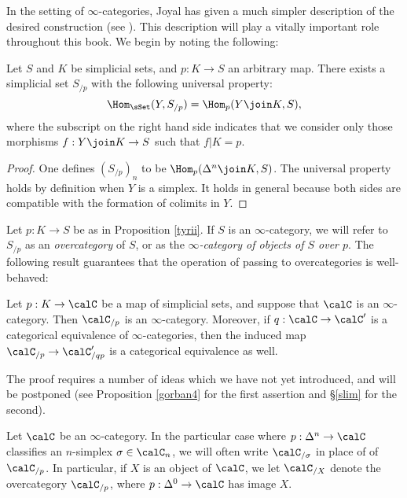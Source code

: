 In the setting of $\infty$-categories, Joyal has given a much simpler description of the desired construction (see \cite{joyalpub}). This description will play a vitally important role throughout this book. We begin by noting the following:

\begin{proposition}\label{tyrii}
Let $S$ and $K$ be simplicial sets, and $p: K \rightarrow S$ an
arbitrary map. There exists a simplicial set $S_{/p}$ with the following universal property:
$$\Hom_{\sSet}(Y, S_{/p}) = \Hom_{p}( Y \join K, S),$$
where the subscript on the right hand side indicates that we
consider only those morphisms $f: Y \join K \rightarrow S$ such
that $f|K = p$.
\end{proposition}

\begin{proof}
One defines $(S_{/p})_n$ to be $\Hom_{p}(\Delta^n \join K, S)$.
The universal property holds by definition when $Y$ is a simplex.
It holds in general because both sides are compatible with the
formation of colimits in $Y$.
\end{proof}

Let $p: K \rightarrow S$ be as in Proposition \ref{tyrii}. If $S$ is an $\infty$-category, we will refer to $S_{/p}$ as an {\it overcategory} of $S$, or as the {\it $\infty$-category of objects of $S$ over $p$}.
The following result guarantees that the operation of passing to overcategories is well-behaved:

\begin{proposition}\label{gorban3}
Let $p: K \rightarrow \calC$ be a map of simplicial sets, and suppose
that $\calC$ is an $\infty$-category. Then $\calC_{/p}$ is an $\infty$-category.
Moreover, if $q: \calC \rightarrow \calC'$ is a categorical equivalence of
$\infty$-categories, then the induced map $\calC_{/p} \rightarrow \calC'_{/qp}$ is a categorical equivalence
as well.
\end{proposition}

The proof requires a number of ideas which we have not yet introduced, and will be postponed (see Proposition \ref{gorban4} for the first assertion and \S \ref{slim} for the second).

\begin{remark}
Let $\calC$ be an $\infty$-category.
In the particular case where $p: \Delta^n \rightarrow \calC$ classifies an
$n$-simplex $\sigma \in \calC_n$, we will often write $\calC_{/\sigma}$ in place of of $\calC_{/p}$.
In particular, if $X$ is an object of $\calC$, we let $\calC_{/X}$ denote the overcategory
$\calC_{/p}$, where $p: \Delta^0 \rightarrow \calC$ has image $X$.
\end{remark}

